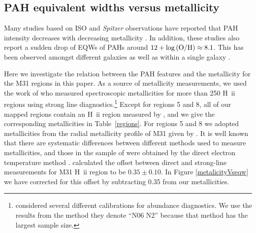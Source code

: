 \subsection{PAH equivalent widths versus metallicity}
\label{sect:eqw_met}

Many studies based on ISO and {\em Spitzer} observations have reported that PAH intensity decreases with decreasing metallicity \citep{Calzetti:2010fk}. 
In addition, these studies also report a sudden drop of EQWs of PAHs around $12+\log{\rm (O/H)} \approx 8.1$. 
This has been observed amongst different galaxies \citep{Engelbracht_2008} as well as within a single galaxy \citep{Gordon:2008lr}. 

Here we investigate the relation between the PAH features and the metallicity for the M31 regions in this paper. 
As a source of metallicity measurements, we used the work of \citet{Sanders_2011} who measured spectroscopic metallicities for
more than 250 H~{\sc ii} regions using strong line diagnostics.\footnote{\citet{Sanders_2011} considered several different
calibrations for abundance diagnostics. We use the results from the method they denote ``N06 N2''  \citep{Nagao2006} because
that method has the largest sample size.} Except for regions 5 and 8, all of our mapped regions contain an  H~{\sc ii} region measured by
 \citet{Sanders_2011}, and we give the corresponding metallicities in Table~\ref{regions}.
 For regions 5 and 8 we adopted metallicities from the radial metallicity profile of M31 given by
 \citet{Sanders_2011}. It is well known that there are systematic differences between different 
 methods used to measure metallicities, and those in the sample of \citet{Engelbracht_2008} 
 were obtained by the direct electron temperature method  \citep{Skillman1998}.
\citet{Mitchel2014} calculated the offset between direct and strong-line measurements for M31 H~{\sc ii} region to be 
$0.35\pm0.10$. In Figure \ref{metalicityVseqw} we have corrected for this offset  by subtracting 0.35 from our metallicities. 


